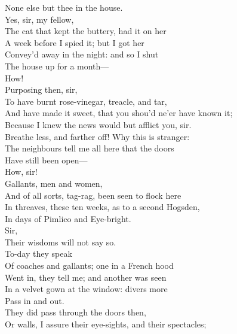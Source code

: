 \documentclass[a4paper,oneside]{memoir}
\begin{document}
\begin{drama*}
None else but thee in the house.\\
\facespeaks {} Yes, sir, my fellow,\\
The cat that kept the buttery, had it on her\\
A week before I spied it; but I got her\\
Convey'd away in the night: and so I shut\\
The house up for a month---\\
\lovewitspeaks {} How!\\
\facespeaks {} Purposing then, sir,\\
To have burnt rose-vinegar, treacle, and tar,\\
And have made it sweet, that you shou'd ne'er have known it;\\
Because I knew the news would but afflict you, sir.\\
\lovewitspeaks Breathe less, and farther off! Why this is stranger:\\
The neighbours tell me all here that the doors\\
Have still been open---\\
\facespeaks {} How, sir!\\
\lovewitspeaks {} Gallants, men and women,\\
And of all sorts, tag-rag, been seen to flock here\\
In threaves, these ten weeks, as to a second Hogsden,\\
In days of Pimlico and Eye-bright.\\
\facespeaks {} Sir,\\
Their wisdoms will not say so.\\
\lovewitspeaks {} To-day they speak\\
Of coaches and gallants; one in a French hood\\
Went in, they tell me; and another was seen\\
In a velvet gown at the window: divers more\\
Pass in and out.\\
\facespeaks {} They did pass through the doors then,\\
Or walls, I assure their eye-sights, and their spectacles;\\

\end{drama*}
\end{document}

